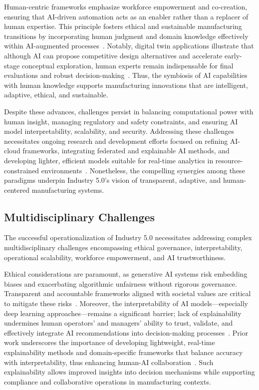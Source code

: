 \documentclass[sigconf]{acmart}
\begin{document}
Human-centric frameworks emphasize workforce empowerment and co-creation, ensuring that AI-driven automation acts as an enabler rather than a replacer of human expertise. This principle fosters ethical and sustainable manufacturing transitions by incorporating human judgment and domain knowledge effectively within AI-augmented processes~\cite{ref2}. Notably, digital twin applications illustrate that although AI can propose competitive design alternatives and accelerate early-stage conceptual exploration, human experts remain indispensable for final evaluations and robust decision-making~\cite{ref2}. Thus, the symbiosis of AI capabilities with human knowledge supports manufacturing innovations that are intelligent, adaptive, ethical, and sustainable.

Despite these advances, challenges persist in balancing computational power with human insight, managing regulatory and safety constraints, and ensuring AI model interpretability, scalability, and security. Addressing these challenges necessitates ongoing research and development efforts focused on refining AI-cloud frameworks, integrating federated and explainable AI methods, and developing lighter, efficient models suitable for real-time analytics in resource-constrained environments~\cite{ref12}. Nonetheless, the compelling synergies among these paradigms underpin Industry 5.0’s vision of transparent, adaptive, and human-centered manufacturing systems.

\subsection{Multidisciplinary Challenges}

The successful operationalization of Industry 5.0 necessitates addressing complex multidisciplinary challenges encompassing ethical governance, interpretability, operational scalability, workforce empowerment, and AI trustworthiness.

Ethical considerations are paramount, as generative AI systems risk embedding biases and exacerbating algorithmic unfairness without rigorous governance. Transparent and accountable frameworks aligned with societal values are critical to mitigate these risks~\cite{ref2,ref41}. Moreover, the interpretability of AI models—especially deep learning approaches—remains a significant barrier; lack of explainability undermines human operators’ and managers’ ability to trust, validate, and effectively integrate AI recommendations into decision-making processes~\cite{ref30}. Prior work underscores the importance of developing lightweight, real-time explainability methods and domain-specific frameworks that balance accuracy with interpretability, thus enhancing human-AI collaboration~\cite{ref30}. Such explainability allows improved insights into decision mechanisms while supporting compliance and collaborative operations in manufacturing contexts.
\end{document}
